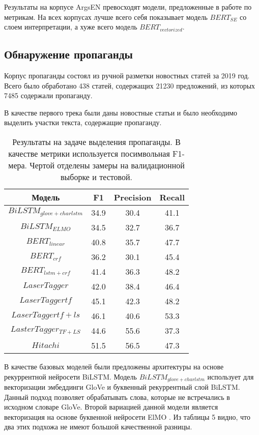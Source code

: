 Результаты на корпусе ArgsEN превосходят модели, предложенные в работе \cite{toledo2020multilingual} по метрикам. На всех корпусах лучше всего себя показывает модель $BERT_{SE}$ со слоем интерпретации, а хуже всего модель $BERT_{vectorized}$.


\subsection{Обнаружение пропаганды}
Корпус пропаганды состоял из ручной разметки новостных статей за 2019 год. Всего было обработано 438 статей, содержащих 21230 предложений, из которых 7485 содержали пропаганду.

В качестве первого трека были даны новостные статьи и было необходимо выделить участки текста, содержащие пропаганду.

\begin{table}[h!]
\centering
\begin{tabular}{|| c | c | c | c |} 
 \hline
 Модель & F1 & Precision & Recall \\ [0.5ex] 
 \hline
 $BiLSTM_{glove+charlstm}$ & 34.9 & 30.4 & 41.1 \\
 $BiLSTM_{ELMO}$ & 34.5 & 32.7 & 36.7 \\
 $BERT_{linear}$ & 40.8 & 35.7 & 47.7 \\
 $BERT_{crf}$ & 36.2 & 30.1 & 45.4 \\
 $BERT_{lstm+crf}$ & 41.4 & 36.3 & 48.2 \\
 $LaserTagger$ & 42.0 & 38.4 & 46.4 \\
 $LaserTagger{tf}$ & 45.1 & 42.3 & 48.2 \\
 $LaserTagger{tf+ls}$ & 46.1 & 40.6 & 53.3 \\
 \hline
 $LasterTagger_{TF+LS}$ & 44.6 & 55.6 & 37.3 \\
 $Hitachi$ & 51.5 & 56.5 & 47.3 \\
 \hline
\end{tabular}
\caption{Результаты на задаче выделения пропаганды. В качестве метрики используется посимвольная F1-мера. Чертой отделены замеры на валидационной выборке и тестовой.}
\label{table:1}
\end{table}

В качестве базовых моделей были предложены архитектуры на основе рекуррентной нейросети BiLSTM. Модель $BiLSTM_{glove+charlstm}$ использует для векторизации эмбеддинги GloVe и буквенный рекуррентный слой BiLSTM. Данный подход позволяет обрабатывать слова, которые не встречались в исходном словаре GloVe. Второй вариацией данной модели является векторизация на основе буквенной нейросети ElMO \cite{Peters:2018}. Из таблицы 5 видно, что два этих подхожа не имеют большой качественной разницы.

